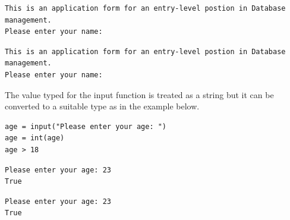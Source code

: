 \documentclass[10pt]{book}
\begin{document}
\label{org7749dc7}
\label{org6610b14}
\begin{verbatim}
This is an application form for an entry-level postion in Database management.
Please enter your name:
\end{verbatim}

\label{orgf75213c}
\begin{verbatim}
This is an application form for an entry-level postion in Database management.
Please enter your name:
\end{verbatim}

The value typed for the input function is treated as a string but it can be converted to a suitable type as in the example below.

\label{org333eea4}
\begin{verbatim}
age = input("Please enter your age: ")
age = int(age)
age > 18
\end{verbatim}

\label{org228769b}
\label{org72916f9}
\begin{verbatim}
Please enter your age: 23
True
\end{verbatim}

\label{orgb226cbe}
\begin{verbatim}
Please enter your age: 23
True
\end{verbatim}
\end{document}
